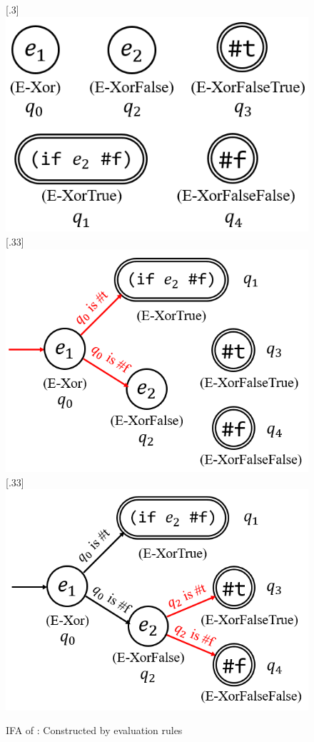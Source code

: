 \begin{figure}[t]
\centering
\subcaptionbox{\label{fig:ifa-xor-a}}[.3\linewidth]{
    \includegraphics[scale=0.22]{images/ifa-xor-1.png}
}
\subcaptionbox{\label{fig:ifa-xor-b}}[.33\linewidth]{
    \includegraphics[scale=0.22]{images/ifa-xor-2.png}
}
\subcaptionbox{\label{fig:ifa-xor-c}}[.33\linewidth]{
    \includegraphics[scale=0.22]{images/ifa-xor-3.png}
}
\caption{IFA of : Constructed by evaluation rules}
\label{fig:ifa-xor}
\end{figure}

